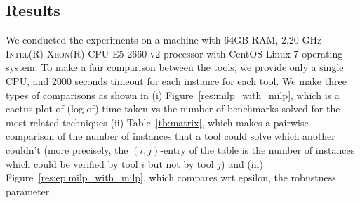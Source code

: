\begin{table}[t]
\centering
{}
    \caption{Neural networks details}
    \label{tb:nndetail}
\end{table}


\subsection{Results}
We conducted the experiments on a machine with \textsc{64GB RAM, 2.20 GHz Intel(R) Xeon(R) CPU E5-2660 v2}
processor with CentOS Linux 7 operating system. 
To make a fair comparison between the tools, we provide only a single \textsc{CPU}, and $2000$ seconds timeout for each instance for each tool. 
We make three types of comparisons as shown in (i) Figure~\ref{res:milp_with_milp}, which is a cactus plot of (log of) time taken vs the number of benchmarks solved for the most related techniques (ii) Table~\ref{tb:matrix}, which makes a pairwise comparison of the number of instances that a tool could solve which another couldn't  (more precisely, the $(i,j)$-entry of the table is the number of instances which could be verified by tool $i$ but not by tool $j$) and (iii) Figure~\ref{res:ep:milp_with_milp}, which compares wrt epsilon, the robustness parameter.

